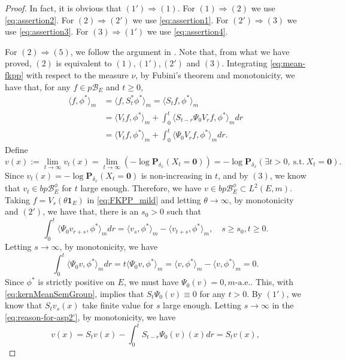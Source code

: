 \documentclass[UTF8]{pkuthss}
\theoremstyle{plain}
\theoremstyle{definition}
\numberwithin{equation}{section}
\begin{document}
\begin{proof}
	In fact, it is obvious that 
	$(1')\Rightarrow (1)$.
	For $(1)\Rightarrow (2)$ we use \eqref{eq:assertion2}.
	For $(2)\Rightarrow (2')$ we use \eqref{eq:assertion1}.
	For $(2')\Rightarrow (3)$ we use \eqref{eq:assertion3}.
	For $(3)\Rightarrow (1')$ we use \eqref{eq:assertion4}.
\par
	For $(2)\Rightarrow (5)$, we follow the argument in \cite[Lemma 3.3]{RenSongZhang2015Limit}.
	Note that, from what we have proved, $(2)$ is equivalent to 
	$(1),(1'),(2')$ and $(3)$.
Integrating \eqref{eq:mean-fkpp} with respect to the measure $\nu$,
	by Fubini's theorem and monotonicity, we have that, for any $f\in p\mathscr B_E$ and $t\geq 0$,
\begin{align}\label{eq:FKPP_mild}
	\langle f,\phi^*\rangle_m
	&=\langle f,S_t^*\phi^*\rangle_m
	=\langle S_tf,\phi^*\rangle_m\\
	&=\langle V_tf,\phi^*\rangle_m + \int_0^t\langle S_{t-r}\Psi_0V_rf,\phi^*\rangle_m dr\\
	&=\langle V_tf,\phi^*\rangle_m + \int_0^t \langle \Psi_0V_rf,\phi^*\rangle_mdr.
\end{align}
	Define
\[
 	v(x)
 	:= \lim_{t\to\infty} v_t(x)
 	= \lim_{t\to\infty}(-\log\mathbf P_{\delta_x}(X_t=\mathbf 0))
 	= -\log \mathbf P_{\delta_x}(\exists t>0, ~\text{s.t.}~ X_t=\mathbf 0).
 \]
	Since $v_t(x)=-\log\mathbf P_{\delta_x}(X_t=\mathbf 0)$ is non-increasing in $t$, and by $(3)$, we know that $v_t\in bp\mathscr B^\phi_E$ for $t$ large enough.
	Therefore, we have $v\in bp\mathscr B^\phi_E\subset L^2(E,m)$.
	Taking $f=V_s(\theta \mathbf 1_E)$ in \eqref{eq:FKPP_mild} and letting $\theta\to\infty$, by monotonicity and $(2')$, we have that, there is an $s_0>0$ such that
\begin{equation}\label{eq:extinction-vt-phi}
	\int_0^t \langle \Psi_0 v_{r+s},\phi^*\rangle_mdr
	=\langle v_s,\phi^*\rangle_m-\langle v_{t+s},\phi^*\rangle_m,
	\quad s\geq s_0, t\geq 0.
\end{equation}
	Letting $s\to\infty$, by monotonicity, we have
\[
	\int_0^t \langle \Psi_0v, \phi^* \rangle_m dr
	= t \langle \Psi_0 v, \phi^* \rangle_m
	= \langle v, \phi^* \rangle_m - \langle v, \phi^* \rangle_m
	= 0.
\]
	Since $\phi^*$ is strictly positive on $E$, we must have $\Psi_0(v) = 0, m\text{-a.e.}$.
	This, with \eqref{eq:kernMeanSemGroup}, implies that $S_t\Psi_0 (v)\equiv 0$ for any $t>0$.
	By $(1')$, we know that $S_t v_s(x)$ take finite value for $s$ large enough.
	Letting $s\to\infty$ in the \eqref{eq:reason-for-asp2'}, by monotonicity, we have
\[
	v(x)
	=S_tv(x)-\int_0^t S_{t-r}\Psi_0(v)(x)dr=S_tv(x),
\]
\end{proof}
\end{document}
